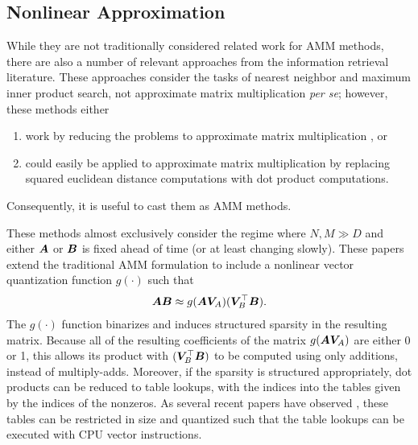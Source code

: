 
\subsection{Nonlinear Approximation}

While they are not traditionally considered related work for AMM methods, there are also a number of relevant approaches from the information retrieval literature. These approaches consider the tasks of nearest neighbor and maximum inner product search, not approximate matrix multiplication \textit{per se}; however, these methods either
\begin{enumerate}
    \item work by reducing the problems to approximate matrix multiplication \cite{cq, aq, otq, sq, stackedQuantizers, bolt}, or
    \item could easily be applied to approximate matrix multiplication by replacing squared euclidean distance computations with dot product computations. \cite{pq, quckAdc, quickerAdc, pairq, grvq, opq, polysemous}
\end{enumerate}
Consequently, it is useful to cast them as AMM methods.

These methods almost exclusively consider the regime where $N, M \gg D$ and either $\bm{A}$ or $\bm{B}$ is fixed ahead of time (or at least changing slowly). These papers extend the traditional AMM formulation to include a nonlinear vector quantization function $g(\cdot)$ such that
\begin{align}
    \bm{A} \bm{B} \approx g(\bm{A} \bm{V}_A) (\bm{V}_B^\top \bm{B}).
\end{align}
The $g(\cdot)$ function binarizes and induces structured sparsity in the resulting matrix. Because all of the resulting coefficients of the matrix $g(\bm{A} \bm{V}_A)$ are either 0 or 1, this allows its product with $(\bm{V}_B^\top \bm{B})$ to be computed using only additions, instead of multiply-adds. Moreover, if the sparsity is structured appropriately, dot products can be reduced to table lookups, with the indices into the tables given by the indices of the nonzeros. As several recent papers have observed \cite{bolt, quickAdc, quickerAdc}, these tables can be restricted in size and quantized such that the table lookups can be executed with CPU vector instructions.

